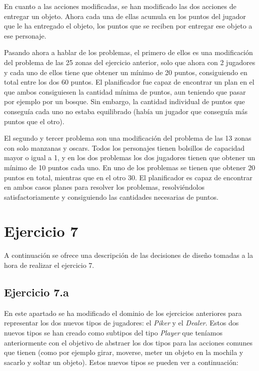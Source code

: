 \documentclass[11pt,a4paper]{article}
\begin{document}
En cuanto a las acciones modificadas, se han modificado las dos acciones de entregar un objeto. Ahora cada una de ellas acumula en los
puntos del jugador que le ha entregado el objeto, los puntos que se reciben por entregar ese objeto a ese personaje.

Pasando ahora a hablar de los problemas, el primero de ellos es una modificación del problema de las 25 zonas del ejercicio anterior,
solo que ahora con 2 jugadores y cada uno de ellos tiene que obtener un mínimo de 20 puntos, consiguiendo en total entre los dos
60 puntos. El planificador fue capaz de encontrar un plan en el que ambos consiguiesen la cantidad mínima de puntos, aun teniendo
que pasar por ejemplo por un bosque. Sin embargo, la cantidad individual de puntos que conseguía cada uno no estaba equilibrado (había
un jugador que conseguía más puntos que el otro).

El segundo y tercer problema son una modificación del problema de las 13 zonas con solo manzanas y oscars. Todos los personajes tienen
bolsillos de capacidad mayor o igual a 1, y en los dos problemas los dos jugadores tienen que obtener un mínimo de 10 puntos cada uno.
En uno de los problemas se tienen que obtener 20 puntos en total, mientras que en el otro 30. El planificador es capaz de encontrar
en ambos casos planes para resolver los problemas, resolviéndolos satisfactoriamente y consiguiendo las cantidades necesarias de
puntos.

\section{Ejercicio 7}

A continuación se ofrece una descripción de las decisiones de diseño tomadas a la hora de realizar el ejercicio 7.

\subsection{Ejercicio 7.a}

En este apartado se ha modificado el dominio de los ejercicios anteriores para representar los dos nuevos tipos de jugadores: el
\textit{Piker} y el \textit{Dealer}. Estos dos nuevos tipos se han creado como subtipos del tipo \textit{Player} que teníamos
anteriormente con el objetivo de abstraer los dos tipos para las acciones comunes que tienen (como por ejemplo girar, moverse, meter
un objeto en la mochila y sacarlo y soltar un objeto). Estos nuevos tipos se pueden ver a continuación:
\end{document}
